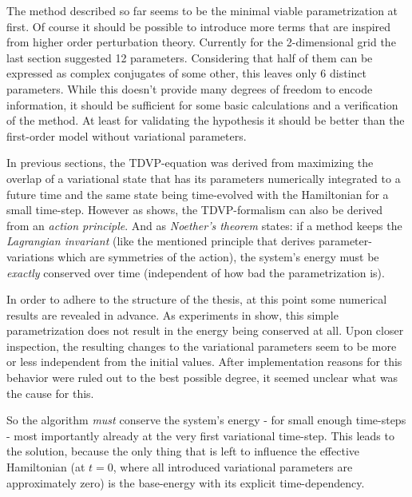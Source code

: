 The method described so far seems to be the minimal viable parametrization at first.
Of course it should be possible to introduce more terms that are inspired from higher order perturbation theory.
Currently for the 2-dimensional grid the last section suggested 12 parameters. 
Considering that half of them can be expressed as complex conjugates of some other, this leaves only 6 distinct parameters.
While this doesn't provide many degrees of freedom to encode information, it should be sufficient for some basic calculations and a verification of the method.
At least for validating the hypothesis it should be better than the first-order model without variational parameters.

In previous sections, the TDVP-equation was derived from maximizing the overlap of a variational state that has its parameters numerically integrated to a future time and the same state being time-evolved with the Hamiltonian for a small time-step.
However as \cite{TDVPcomplexPrefactors} shows, the TDVP-formalism can also be derived from an \emph{action principle}.
And as \emph{Noether's theorem} states: if a method keeps the \emph{Lagrangian invariant} (like the mentioned principle that derives parameter-variations which are symmetries of the action), the system's energy must be \emph{exactly} conserved over time \cite{energyConservationFromActionPrinciple} (independent of how \glqq bad\grqq{} the parametrization is).

In order to adhere to the structure of the thesis, at this point some numerical results are revealed in advance. 
As experiments in  show, this simple parametrization does not result in the energy being conserved at all.
Upon closer inspection, the resulting changes to the variational parameters seem to be more or less independent from the initial values.
After implementation reasons for this behavior were ruled out to the best possible degree, it seemed unclear what was the cause for this.

So the algorithm \emph{must} conserve the system's energy - for small enough time-steps - most importantly already at the very first variational time-step.
This leads to the solution, because the only thing that is left to influence the effective Hamiltonian (at $t=0$, where all introduced variational parameters are approximately zero) is the base-energy with its explicit time-dependency.

